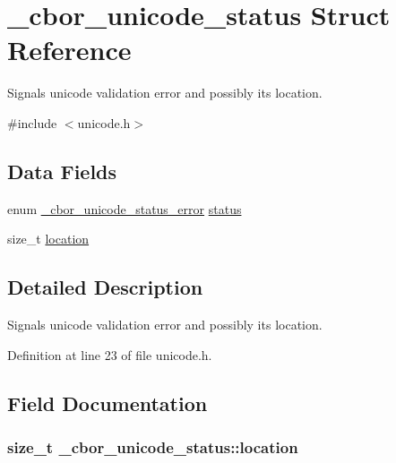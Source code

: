 \hypertarget{struct__cbor__unicode__status}{\section{\-\_\-cbor\-\_\-unicode\-\_\-status Struct Reference}
\label{struct__cbor__unicode__status}
}


Signals unicode validation error and possibly its location.  




{\ttfamily \#include $<$unicode.\-h$>$}

\subsection*{Data Fields}
\begin{DoxyCompactItemize}
\item 
enum \hyperlink{unicode_8h_a5f58283b505b6cc8a5646516ae20831f}{\-\_\-cbor\-\_\-unicode\-\_\-status\-\_\-error} \hyperlink{struct__cbor__unicode__status_a06b8c4d673a659a046aa3adea53cdef8}{status}
\item 
size\-\_\-t \hyperlink{struct__cbor__unicode__status_a74b5cdcf18d76a2cdb19c37857f170a7}{location}
\end{DoxyCompactItemize}


\subsection{Detailed Description}
Signals unicode validation error and possibly its location. 

Definition at line 23 of file unicode.\-h.



\subsection{Field Documentation}
\hypertarget{struct__cbor__unicode__status_a74b5cdcf18d76a2cdb19c37857f170a7}{
\subsubsection[{location}]{\setlength{\rightskip}{0pt plus 5cm}size\-\_\-t \-\_\-cbor\-\_\-unicode\-\_\-status\-::location}}\label{struct__cbor__unicode__status_a74b5cdcf18d76a2cdb19c37857f170a7}


